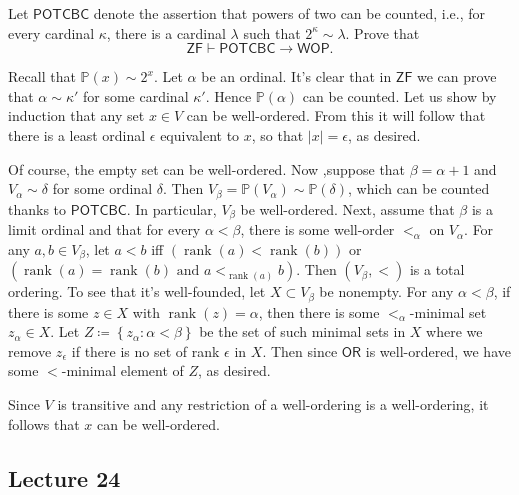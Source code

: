 \documentclass[10pt,letterpaper,cm]{nupset}
\theoremstyle{definition}
\theoremstyle{theorem}
\theoremstyle{remark}
\renewcommand{\P}{\mathbb P}
\newcommand{\1}{\mathbf{1}}
\newcommand{\0}{\vec 0}
\newcommand{\zf}{\mathsf{ZF}}
\newcommand{\ord}{\mathsf{OR}}
\DeclareMathOperator{\rnk}{rank}
\begin{document}
\begin{problem}
Let $\mathsf{POTCBC}$ denote the assertion that powers of two can be counted, i.e., for every cardinal $\kappa$, there is a cardinal $\lambda$ such that $2^{\kappa} \sim \lambda$. Prove that $$\zf \vdash \mathsf{POTCBC} \rightarrow \mathsf{WOP}.$$
\end{problem}
\begin{solution}
Recall that $\P(x)\sim 2^x$. Let $\alpha$ be an ordinal. It's clear that in $\zf$ we can prove that $\alpha \sim \kappa'$ for some cardinal $\kappa '$. Hence $\P(\alpha)$ can be counted. Let us show by induction that any set $x\in V$ can be well-ordered. From this it will follow that there is a least ordinal $\epsilon$ equivalent to $x$, so that $\left\lvert{x}\right\rvert=\epsilon$, as desired.

\smallskip

Of course, the empty set can be well-ordered. Now ,suppose that $\beta= \alpha +1$ and $V_\alpha \sim \delta$ for some ordinal $\delta$. Then $V_\beta= \P(V_\alpha) \sim \P(\delta)$, which can be counted thanks to $\mathsf{POTCBC}$.  In particular, $V_\beta$  be well-ordered. Next, assume that $\beta$ is a limit ordinal and that for every $\alpha < \beta$, there is some well-order $<_{\alpha}$ on $V_{\alpha}$.  For any $a, b\in V_\beta$, let $a< b$ iff $\left(\rnk(a) < \rnk(b)\right)$ or $\left(\rnk(a)=\rnk(b) \text{ and } a<_{\rnk(a)} b\right)$. Then $\left(V_{\beta}, <\right)$ is  a total ordering. To see that it's well-founded, let $X\subset V_{\beta}$ be nonempty. For any $\alpha <\beta$, if there is some $z\in X$ with $\rnk(z)=\alpha$, then there is some $<_{\alpha}$-minimal set $z_{\alpha} \in X$.  Let $Z\coloneqq \left\{z_\alpha :\alpha <\beta\right\}$ be the set of such minimal sets in $X$ where we remove $z_{\epsilon}$ if there is no set of rank $\epsilon$ in $X$. Then since $\ord$ is well-ordered, we have some $<$-minimal element of $Z$, as desired.  

\smallskip

 Since $V$ is transitive and any restriction of a well-ordering is a well-ordering, it follows that $x$ can be well-ordered.
\end{solution}

\subsection{Lecture 24}
\end{document}
